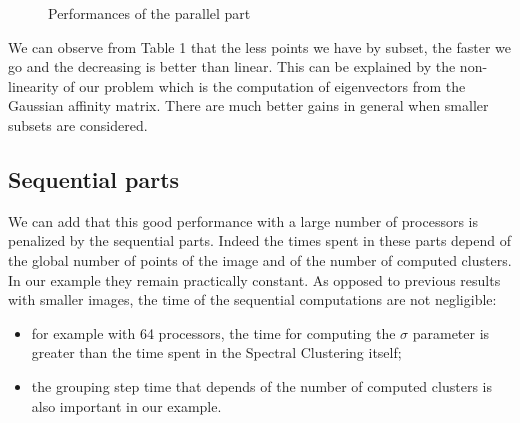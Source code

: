 \documentclass[runningheads,a4paper]{llncs}
\begin{document}
\begin{figure}
  \begin{center}
  \end{center}
  \caption{Performances of the parallel part}
  \label{fig:costs}
 \end{figure}

We can observe from Table 1 that the less points we have by subset, the faster
we go and the decreasing is better than linear. This can be explained by the
non-linearity of our problem which is the computation of eigenvectors from the
Gaussian affinity matrix. There are much better gains in general when smaller
subsets are considered.

\subsection{Sequential parts}
We can add that this good performance with a large number of processors is
penalized by the sequential parts. Indeed the times spent in these parts
depend of the global number of points of the image and of the number of
computed clusters. In our example they remain practically 
constant. As opposed to previous results with smaller images, the
time of the sequential computations are not negligible:
\begin{itemize}
  \item for example with 64 processors, the time for computing the $\sigma$
        parameter is greater than the time spent in the Spectral Clustering
        itself;
  \item the grouping step time that depends of the number of computed clusters
        is also important in our example.
\end{itemize}
\end{document}
